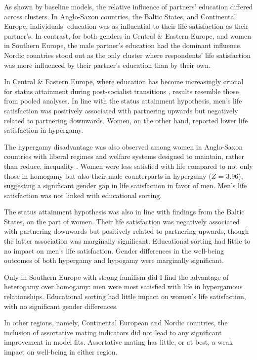 As shown by baseline models, the relative influence of partners' education differed across clusters. In Anglo-Saxon countries, the Baltic States, and Continental Europe, individuals' education was as influential to their life satisfaction as their partner's. In contrast, for both genders in Central \& Eastern Europe, and women in Southern Europe, the male partner's education had the dominant influence. Nordic countries stood out as the only cluster where respondents' life satisfaction was more influenced by their partner's education than by their own.

In Central \& Eastern Europe, where education has become increasingly crucial for status attainment during post-socialist transitions \parencite{mullerEducationYouthIntegration2005}, results resemble those from pooled analyses. In line with the status attainment hypothesis, men's life satisfaction was positively associated with partnering upwards but negatively related to partnering downwards. Women, on the other hand, reported lower life satisfaction in hypergamy.

The hypergamy disadvantage was also observed among women in Anglo-Saxon countries with liberal regimes and welfare systems designed to maintain, rather than reduce, inequality \parencite{esping-andersenThreeWorldsWelfare1990,esping-andersenWelfareRegimesSocial2015}. Women were less satisfied with life compared to not only those in homogamy but also their male counterparts in hypergamy ($Z$ = 3.96), suggesting a significant gender gap in life satisfaction in favor of men. Men's life satisfaction was not linked with educational sorting.

The status attainment hypothesis was also in line with findings from the Baltic States, on the part of women. Their life satisfaction was negatively associated with partnering downwards but positively related to partnering upwards, though the latter association was marginally significant. Educational sorting had little to no impact on men's life satisfaction. Gender differences in the well-being outcomes of both hypergamy and hypogamy were marginally significant.

Only in Southern Europe with strong familism did I find the advantage of heterogamy over homogamy: men were most satisfied with life in hypergamous relationships. Educational sorting had little impact on women's life satisfaction, with no significant gender differences.

In other regions, namely, Continental European and Nordic countries, the inclusion of assortative mating indicators did not lead to any significant improvement in model fits. Assortative mating has little, or at best, a weak impact on well-being in either region.

